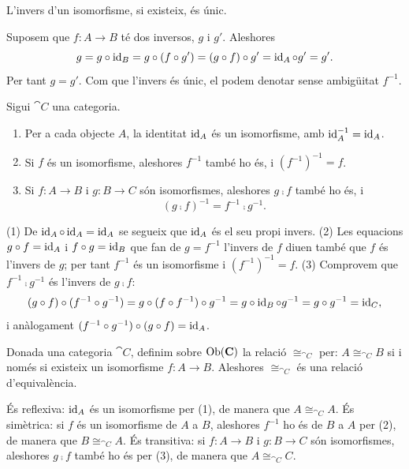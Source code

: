 \begin{proposicio}
L'invers d'un isomorfisme, si existeix, és únic.
\end{proposicio}

\begin{prova}
Suposem que $f\colon A\to B$ té dos inversos, $g$ i $g'$. Aleshores
\[
g=g\circ\operatorname{id}_B=g\circ(f\circ g')=(g\circ f)\circ g'=\operatorname{id}_A\circ g'=g'.
\]
Per tant $g=g'$. Com que l'invers és únic, el podem denotar sense ambigüitat $f^{-1}$.
\end{prova}

\begin{proposicio}
Sigui $\cat{C}$ una categoria.
\begin{enumerate}
\item Per a cada objecte $A$, la identitat $\operatorname{id}_A$ és un isomorfisme, amb $\operatorname{id}_A^{-1}=\operatorname{id}_A$.
\item Si $f$ és un isomorfisme, aleshores $f^{-1}$ també ho és, i $(f^{-1})^{-1}=f$.
\item Si $f\colon A\to B$ i $g\colon B\to C$ són isomorfismes, aleshores $g\comp f$ també ho és, i
\[
(g\comp f)^{-1}=f^{-1}\comp g^{-1}.
\]
\end{enumerate}
\end{proposicio}

\begin{prova}
(1) De $\operatorname{id}_A\circ\operatorname{id}_A=\operatorname{id}_A$ se segueix que $\operatorname{id}_A$ és el seu propi invers. (2) Les equacions $g\circ f=\operatorname{id}_A$ i $f\circ g=\operatorname{id}_B$ que fan de $g=f^{-1}$ l'invers de $f$ diuen també que $f$ és l'invers de $g$; per tant $f^{-1}$ és un isomorfisme i $(f^{-1})^{-1}=f$. (3) Comprovem que $f^{-1}\comp g^{-1}$ és l'invers de $g\comp f$:
\[
(g\circ f)\circ(f^{-1}\circ g^{-1})=g\circ(f\circ f^{-1})\circ g^{-1}=g\circ\operatorname{id}_B\circ g^{-1}=g\circ g^{-1}=\operatorname{id}_C,
\]
i anàlogament $(f^{-1}\circ g^{-1})\circ(g\circ f)=\operatorname{id}_A$.
\end{prova}

\begin{corollari}
Donada una categoria $\cat{C}$, definim sobre $\operatorname{Ob}(\mathbf{C})$ la relació $\cong_{\cat{C}}$ per: $A\cong_{\cat{C}}B$ si i només si existeix un isomorfisme $f\colon A\to B$. Aleshores $\cong_{\cat{C}}$ és una relació d'equivalència.
\end{corollari}

\begin{prova}
És reflexiva: $\operatorname{id}_A$ és un isomorfisme per (1), de manera que $A\cong_{\cat{C}}A$. És simètrica: si $f$ és un isomorfisme de $A$ a $B$, aleshores $f^{-1}$ ho és de $B$ a $A$ per (2), de manera que $B\cong_{\cat{C}}A$. És transitiva: si $f\colon A\to B$ i $g\colon B\to C$ són isomorfismes, aleshores $g\comp f$ també ho és per (3), de manera que $A\cong_{\cat{C}}C$.
\end{prova}

